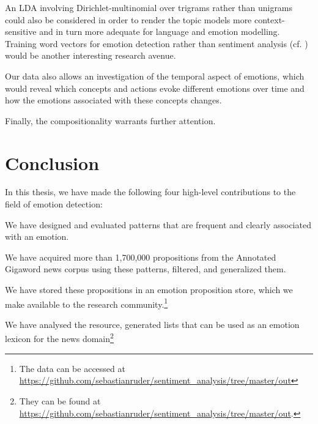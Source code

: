 An LDA involving Dirichlet-multinomial over trigrams rather than unigrams could also be considered in order to render the topic models more context-sensitive and in turn more adequate for language and emotion modelling. Training word vectors for emotion detection rather than sentiment analysis (cf. \cite{word_vectors_sentiment}) would be another interesting research avenue.

Our data also allows an investigation of the temporal aspect of emotions, which would reveal which concepts and actions evoke different emotions over time and how the emotions associated with these concepts changes.

Finally, the compositionality warrants further attention. 

\section{Conclusion} \label{sec:conclusion}

In this thesis, we have made the following four high-level contributions to the field of emotion detection:

\begin{aenumerate}
	\item We have designed and evaluated patterns that are frequent and clearly associated with an emotion.
	\item We have acquired more than 1,700,000 propositions from the Annotated Gigaword news corpus \cite{annotated_gigaword} using these patterns, filtered, and generalized them.
	\item We have stored these propositions in an emotion proposition store, which we make available to the research community.\footnote{The data can be accessed at \url{https://github.com/sebastianruder/sentiment_analysis/tree/master/out}}
	\item We have analysed the resource, generated lists that can be used as an emotion lexicon for the news domain\footnote{They can be found at \url{https://github.com/sebastianruder/sentiment_analysis/tree/master/out}.}
\end{aenumerate}

